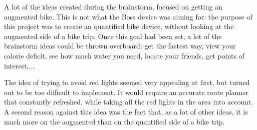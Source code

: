 A lot of the ideas created during the brainstorm, focused on getting an augmented bike. 
This is not what the Boss device was aiming for: the purpose of this project was to create an quantified bike device, without looking at the augmented side of a bike trip. 
Once this goal had been set, a lot of the brainstorm ideas could be thrown overboard: get the fastest way, view your calorie deficit, see how much water you need, locate your friends, get points of interest,...

The idea of trying to avoid red lights seemed very appealing at first, but turned out to be too difficult to implement. It would require an accurate route planner that constantly refreshed, while taking all the red lights in the area into account. A second reason against this idea was the fact that, as a lot of other ideas, it is much more on the augmented than on the quantified side of a bike trip. 